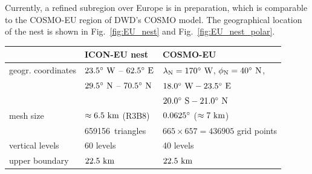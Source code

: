 Currently, a refined subregion over Europe is in preparation,
which is comparable to the COSMO-EU region of DWD's COSMO model.
The geographical location of the nest is shown in
Fig.~\ref{fig:EU_nest} and Fig.~\ref{fig:EU_nest_polar}.

\begin{table}
\centering
\begin{tabular}{|p{5cm}|l|l|}\hline
\rowcolor{Gray}
                           &    {\centering\textbf{ICON-EU nest}}                 &     {\centering\textbf{COSMO-EU}} \\ \hline\hline
geogr. coordinates         &    $23.5^{\circ}~\text{W}$ -- $62.5^{\circ}~\text{E}$    &     $\lambda_{\text{N}} = 170^{\circ}~\text{W}$, 
                                                                                          $\phi_{\text{N}}    =  40^{\circ}~\text{N}$,     \\
                           &    $29.5^{\circ}~\text{N}$ -- $70.5^{\circ}~\text{N}$   &      $18.0^{\circ}~\text{W} - 23.5^{\circ}~\text{E}$ \\
                           &                                                      &     $20.0^{\circ}~\text{S} - 21.0^{\circ}~\text{N}$  \\[0.5em]
mesh size                  &    $\approx 6.5~\text{km}$ (R3B8)                          &     $0.0625^{\circ}$ ($\approx 7~\text{km}$) \\
                           &    659156~triangles                                  &     $665 \times 657 = 436905$ grid points \\
vertical levels            &    60 levels                                         &     40 levels      \\
upper boundary             &    $22.5~\text{km}$                                        &     $22.5~\text{km}$ \\ \hline

\end{tabular}
\end{table}



